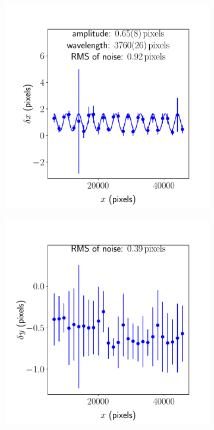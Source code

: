 \documentclass{article}
\begin{document}
\begin{figure}[ht]
\begin{subfigure}{0.24\linewidth}
		\caption{}
		\label{fig:sinewave2yyBMS}
	\end{subfigure}
	\begin{subfigure}{0.24\linewidth}
		\includegraphics[width=\linewidth]{sine-wave-4-xx-BMS.pdf}
		\caption{}
		\label{fig:sinewave4xxBMS}
	\end{subfigure}
	\begin{subfigure}{0.24\linewidth}
		\includegraphics[width=\linewidth]{sine-wave-4-yx-BMS.pdf}

\end{subfigure}
\end{figure}
\end{document}
